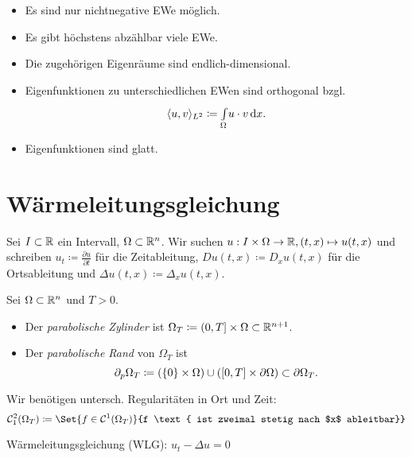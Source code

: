 \documentclass{cheat-sheet}
\begin{document}
\begin{bemn}
  \begin{itemize}
    \item Es sind nur nichtnegative EWe möglich.
    \item Es gibt höchstens abzählbar viele EWe.
    \item Die zugehörigen Eigenräume sind endlich-dimensional.
    \item Eigenfunktionen zu unterschiedlichen EWen sind orthogonal bzgl.
    \[ \langle u, v \rangle_{L^2} \coloneqq {\textstyle \int\limits_{\Omega}^{}} u \cdot v \,\mathrm{d} x. \]
    \item Eigenfunktionen sind glatt.
  \end{itemize}
\end{bemn}

\section{Wärmeleitungsgleichung}

\begin{nota}
  Sei $I \subset \mathbb{R}$ ein Intervall, $\Omega \subset \mathbb{R}^n$. Wir suchen $u : I \times \Omega \to \mathbb{R}, (t, x) \mapsto u(t, x)$ und schreiben $u_t \coloneqq \tfrac{\partial u}{\partial t}$ für die Zeitableitung, $D u(t, x) \coloneqq D_x u(t, x)$ für die Ortsableitung und $\Delta u(t,x) \coloneqq \Delta_x u(t,x)$.
\end{nota}

\begin{defn}
  Sei $\Omega \subset \mathbb{R}^n$ und $T > 0$.
  \begin{itemize}
    \item Der \emph{parabolische Zylinder} ist $\Omega_T \coloneqq \left( 0, T \right] \times \Omega \subset \mathbb{R}^{n+1}$.
    \item Der \emph{parabolische Rand} von $\Omega_T$ ist
    \[ \partial_p \Omega_T \coloneqq (\{ 0 \} \times \Omega) \cup (\left[ 0, T \right] \times \partial \Omega) \subset \partial \Omega_T. \]
  \end{itemize}
\end{defn}

\begin{nota}
  Wir benötigen untersch. Regularitäten in Ort und Zeit:
  \[ \mathcal{C}_1^2(\Omega_T) \coloneqq \Set{f \in \mathcal{C}^1(\Omega_T)}{f \text{ ist zweimal stetig nach $x$ ableitbar}} \]
\end{nota}

\begin{prob}
  Wärmeleitungsgleichung (WLG): $u_t - \Delta u = 0$
\end{prob}
\end{document}
